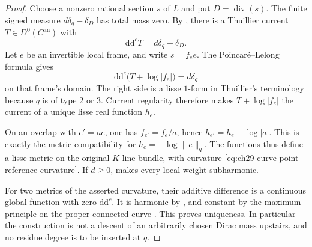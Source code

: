 \begin{proof}
Choose a nonzero rational section \(s\) of \(L\) and put
\(D=\operatorname{div}(s)\).  The finite signed measure
\(d\delta_q-\delta_D\) has total mass zero.  By
\cite[Theorem~3.3.13(ii)]{Thu05}, there is a Thuillier current
\(T\in D^0(C^{\mathrm{an}})\) with
\begin{equation}
\label{eq:ch29-curve-reference-current}
              \mathrm d\mathrm d^cT=d\delta_q-\delta_D.
\end{equation}
Let \(e\) be an invertible local frame, and write \(s=f_e e\).
The Poincar\'e--Lelong formula gives
\[
 \mathrm d\mathrm d^c\bigl(T+\log|f_e|\bigr)=d\delta_q
\]
on that frame's domain.  The right side is a lisse \(1\)-form in
Thuillier's terminology because \(q\) is of type \(2\) or \(3\).
Current regularity \cite[Proposition~3.3.11]{Thu05} therefore makes
\(T+\log|f_e|\) the current of a unique lisse real function \(h_e\).

On an overlap with \(e'=a e\), one has \(f_{e'}=f_e/a\), hence
\(h_{e'}=h_e-\log|a|\).  This is exactly the metric compatibility
for \(h_e=-\log\lVert e\rVert_q\).  The functions thus define a
lisse metric on the original \(K\)-line bundle, with curvature
\eqref{eq:ch29-curve-point-reference-curvature}.  If \(d\geq0\),
\cite[Theorem~3.4.12(ii)]{Thu05} makes every local weight subharmonic.

For two metrics of the asserted curvature, their additive difference
is a continuous global function with zero \(\mathrm d\mathrm d^c\).
It is harmonic by \cite[Lemma~3.3.12]{Thu05}, and constant by the
maximum principle on the proper connected curve
\cite[Proposition~3.1.1]{Thu05}.  This proves uniqueness.  In particular
the construction is not a descent of an arbitrarily chosen Dirac mass
upstairs, and no residue degree is to be inserted at \(q\).
\end{proof}


